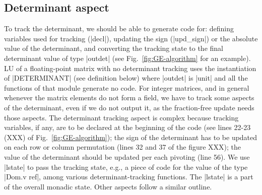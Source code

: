 \documentclass{elsart}
\begin{document}
\subsection{Determinant aspect}
\label{sec:det}

To track the determinant, we should be able to generate code
for: defining variables used for tracking (|decl|),
updating the sign (|upd_sign|) or the absolute
value of the determinant, and converting the tracking state
to the final determinant value of type |outdet| (see
Fig.~\ref{fig:GE-algorithm} for an example).
LU of a
floating-point matrix with no determinant tracking uses the
instantiation of |DETERMINANT| (see definition below) where |outdet| is |unit|
and all the
functions of that module generate no code. For integer matrices, and
in general whenever the matrix elements do not form a field, we
have to track some aspects of the determinant, even if we do not output
it, as the fraction-free update needs those aspects. The determinant tracking
aspect is complex because tracking variables, if any, are to be declared at the
beginning of the code (see lines 22-23 (XXX) of
Fig.~\ref{fig:GE-algorithm}); the sign
of the determinant has to be updated on each row or column
permutation (lines 32 and 37 of the figure XXX);
the value of the determinant should be updated per each
pivoting (line 56). We use |lstate| to pass the tracking state, e.g., a piece of
code for the value of the type |Dom.v ref|, among
various determinant-tracking functions. The |lstate| is a part of the
overall monadic state. 
Other aspects follow a similar outline.
\end{document}

